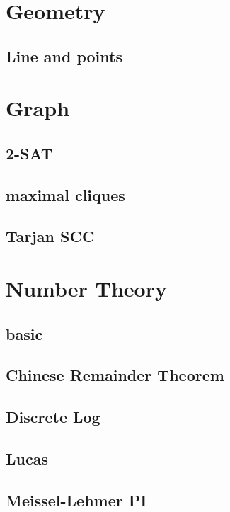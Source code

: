 \section{Geometry}
\subsection{Line and points}


\section{Graph}
\subsection{2-SAT}

\subsection{maximal cliques}

\subsection{Tarjan SCC}


\section{Number Theory}
\subsection{basic}

\subsection{Chinese Remainder Theorem}

\subsection{Discrete Log}

\subsection{Lucas}

\subsection{Meissel-Lehmer PI}

